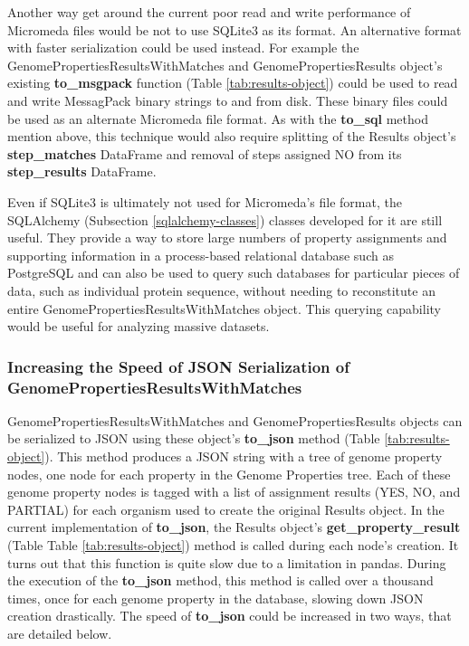 Another way get around the current poor read and write performance of Micromeda files would be not to use SQLite3 as its format. An alternative format with faster serialization could be used instead. For example the GenomePropertiesResultsWithMatches and GenomePropertiesResults object's existing \textbf{to\_msgpack} function (Table \ref{tab:results-object}) could be used to read and write MessagPack binary strings to and from disk. These binary files could be used as an alternate Micromeda file format. As with the \textbf{to\_sql} method mention above, this technique would also require splitting of the Results object's \textbf{step\_matches} DataFrame and removal of steps assigned NO from its \textbf{step\_results} DataFrame.

Even if SQLite3 is ultimately not used for Micromeda's file format, the SQLAlchemy (Subsection \ref{sqlalchemy-classes}) classes developed for it are still useful. They provide a way to store large numbers of property assignments and supporting information in a process-based relational database such as PostgreSQL and can also be used to query such databases for particular pieces of data, such as individual protein sequence, without needing to reconstitute an entire GenomePropertiesResultsWithMatches object. This querying capability would be useful for analyzing massive datasets.

\subsubsection{Increasing the Speed of JSON Serialization of GenomePropertiesResultsWithMatches} \label{pygenprop-json-serialization}

GenomePropertiesResultsWithMatches and GenomePropertiesResults objects can be serialized to JSON using these object's \textbf{to\_json} method (Table \ref{tab:results-object}). This method produces a JSON string with a tree of genome property nodes, one node for each property in the Genome Properties tree. Each of these genome property nodes is tagged with a list of assignment results (YES, NO, and PARTIAL) for each organism used to create the original Results object. In the current implementation of \textbf{to\_json}, the Results object's \textbf{get\_property\_result} (Table Table \ref{tab:results-object}) method is called during each node's creation. It turns out that this function is quite slow due to a limitation in pandas. During the execution of the  \textbf{to\_json} method, this method is called over a thousand times, once for each genome property in the database, slowing down JSON creation drastically. The speed of \textbf{to\_json}  could be increased in two ways, that are detailed below.


